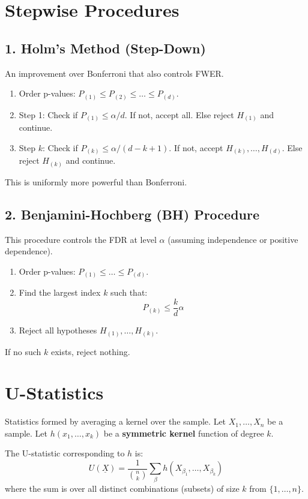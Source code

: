 \documentclass[12pt, a4paper]{article}
\theoremstyle{definition}
\newcommand{\Xvec}{\underline{X}}
\begin{document}
\section{Stepwise Procedures}

\subsection{1. Holm's Method (Step-Down)}
An improvement over Bonferroni that also controls FWER.
\begin{enumerate}
    \item Order p-values: $P_{(1)} \le P_{(2)} \le \dots \le P_{(d)}$.
    \item Step 1: Check if $P_{(1)} \le \alpha/d$. If not, accept all. Else reject $H_{(1)}$ and continue.
    \item Step $k$: Check if $P_{(k)} \le \alpha/(d-k+1)$. If not, accept $H_{(k)}, \dots, H_{(d)}$. Else reject $H_{(k)}$ and continue.
\end{enumerate}
This is uniformly more powerful than Bonferroni.

\subsection{2. Benjamini-Hochberg (BH) Procedure}
This procedure controls the FDR at level $\alpha$ (assuming independence or positive dependence).
\begin{enumerate}
    \item Order p-values: $P_{(1)} \le \dots \le P_{(d)}$.
    \item Find the largest index $k$ such that:
    $$ P_{(k)} \le \frac{k}{d} \alpha $$
    \item Reject all hypotheses $H_{(1)}, \dots, H_{(k)}$.
\end{enumerate}
If no such $k$ exists, reject nothing.

\section{U-Statistics}

Statistics formed by averaging a kernel over the sample.
Let $X_1, \dots, X_n$ be a sample.
Let $h(x_1, \dots, x_k)$ be a \textbf{symmetric kernel} function of degree $k$.

The U-statistic corresponding to $h$ is:
$$ U(\Xvec) = \frac{1}{\binom{n}{k}} \sum_{\beta} h(X_{\beta_1}, \dots, X_{\beta_k}) $$
where the sum is over all distinct combinations (subsets) of size $k$ from $\{1, \dots, n\}$.
\end{document}
